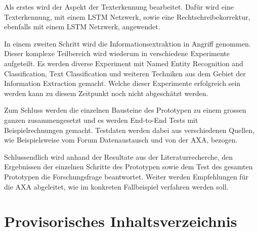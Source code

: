 \documentclass{hwz}
\newcommand{\mysection}[1]{
    \newpage
    \section{#1}
}
\begin{document}
Als erstes wird der Aspekt der Texterkennung bearbeitet. Dafür wird eine Texterkennung, mit einem LSTM Netzwerk, sowie eine Rechtschreibekorrektur, ebenfalls mit einem LSTM Netzwerk, angewendet.

In einem zweiten Schritt wird die Informationsextraktion in Angriff genommen. Dieser komplexe Teilbereich wird wiederum in verschiedene Experimente aufgeteilt. Es werden diverse Experiment mit Named Entity Recognition and Classification, Text Classification und weiteren Techniken aus dem Gebiet der Information Extraction gemacht. Welche dieser Experimente erfolgreich sein werden kann zu diesem Zeitpunkt noch nicht abgeschätzt werden.

Zum Schluss werden die einzelnen Bausteine des Prototypen zu einem grossen ganzen zusammengesetzt und es werden End-to-End Tests mit Beispielrechnungen gemacht. Testdaten werden dabei aus verschiedenen Quellen, wie Beispielsweise vom Forum Datenaustausch und von der AXA, bezogen.

Schlussendlich wird anhand der Resultate aus der Literaturrecherche, den Ergebnissen der einzelnen Schritte des Prototypen sowie dem Test des gesamten Prototypen die Forschungsfrage beantwortet. Weiter werden Empfehlungen für die AXA abgeleitet, wie im konkreten Fallbeispiel verfahren werden soll.

%
%
%
%
 
\mysection{Provisorisches Inhaltsverzeichnis} 

\end{document}
